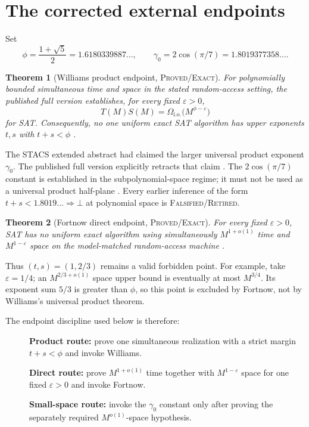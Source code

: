 \documentclass[11pt]{article}
\newtheorem{theorem}{Theorem}[section]
\newcommand{\Exact}{\textsc{Proved/Exact}}
\newcommand{\Retired}{\textsc{Falsified/}\allowbreak\textsc{Retired}}
\begin{document}
\section{The corrected external endpoints}

Set
\[
 \phi=\frac{1+\sqrt5}{2}=1.6180339887\ldots,
 \qquad
 \gamma_0=2\cos(\pi/7)=1.8019377358\ldots.
\]

\begin{theorem}[Williams product endpoint, \Exact{}]
For polynomially bounded simultaneous time and space in the stated
random-access setting, the published full version establishes, for every
fixed $\varepsilon>0$,
\[
 T(M)S(M)=\Omega_{\mathrm{i.o.}}
       \bigl(M^{\phi-\varepsilon}\bigr)
\]
for SAT.  Consequently, no one uniform exact SAT algorithm has upper
exponents $t,s$ with $t+s<\phi$ \cite[Theorem~4.11]{williams2010}.
\end{theorem}

The STACS extended abstract had claimed the larger universal product
exponent $\gamma_0$.  The published full version explicitly retracts that
claim \cite[Section~4.5, footnote~9]{williams2010}.  The
$2\cos(\pi/7)$ constant is established in the subpolynomial-space regime;
it must not be used as a universal product half-plane
\cite{williams2008mod,busswilliams2015}.  Every earlier inference of the form
$t+s<1.8019\ldots\Rightarrow\bot$ at polynomial space is \Retired{}.

\begin{theorem}[Fortnow direct endpoint, \Exact{}]
For every fixed $\varepsilon>0$, SAT has no uniform exact algorithm using
simultaneously $M^{1+o(1)}$ time and $M^{1-\varepsilon}$ space on the
model-matched random-access machine \cite{fortnow2000}.
\end{theorem}

Thus $(t,s)=(1,2/3)$ remains a valid forbidden point.  For example, take
$\varepsilon=1/4$; an $M^{2/3+o(1)}$ space upper bound is eventually at most
$M^{3/4}$.  Its exponent sum $5/3$ is greater than $\phi$, so this point is
excluded by Fortnow, not by Williams's universal product theorem.

The endpoint discipline used below is therefore:
\begin{description}
\item[] \textbf{Product route:} prove one simultaneous realization with a
strict margin $t+s<\phi$ and invoke Williams.
\item[] \textbf{Direct route:} prove $M^{1+o(1)}$ time together with
$M^{1-\varepsilon}$ space for one fixed $\varepsilon>0$ and invoke Fortnow.
\item[] \textbf{Small-space route:} invoke the $\gamma_0$ constant only
after proving the separately required $M^{o(1)}$-space hypothesis.
\end{description}
\end{document}
